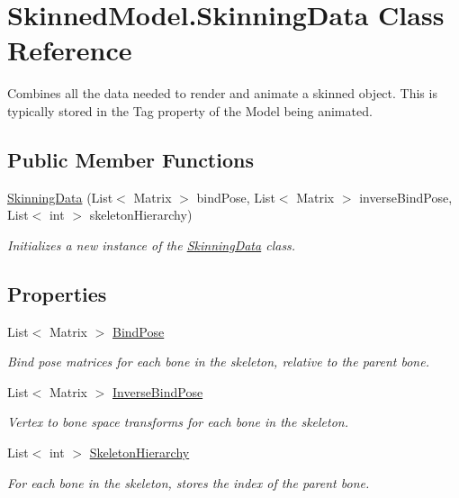\hypertarget{class_skinned_model_1_1_skinning_data}{\section{Skinned\+Model.\+Skinning\+Data Class Reference}
\label{class_skinned_model_1_1_skinning_data}
}


Combines all the data needed to render and animate a skinned object. This is typically stored in the Tag property of the Model being animated.  


\subsection*{Public Member Functions}
\begin{DoxyCompactItemize}
\item 
\hyperlink{class_skinned_model_1_1_skinning_data_afec5d3b876e4a1b553d6aa6b0c88aee5}{Skinning\+Data} (List$<$ Matrix $>$ bind\+Pose, List$<$ Matrix $>$ inverse\+Bind\+Pose, List$<$ int $>$ skeleton\+Hierarchy)
\begin{DoxyCompactList}\small\item\em Initializes a new instance of the \hyperlink{class_skinned_model_1_1_skinning_data}{Skinning\+Data} class. \end{DoxyCompactList}\end{DoxyCompactItemize}
\subsection*{Properties}
\begin{DoxyCompactItemize}
\item 
List$<$ Matrix $>$ \hyperlink{class_skinned_model_1_1_skinning_data_a9cc764c802f632777c48cf7d4cec6e3f}{Bind\+Pose}
\begin{DoxyCompactList}\small\item\em Bind pose matrices for each bone in the skeleton, relative to the parent bone. \end{DoxyCompactList}\item 
List$<$ Matrix $>$ \hyperlink{class_skinned_model_1_1_skinning_data_a480419d9a7614d8e72b95e694d9ce908}{Inverse\+Bind\+Pose}
\begin{DoxyCompactList}\small\item\em Vertex to bone space transforms for each bone in the skeleton. \end{DoxyCompactList}\item 
List$<$ int $>$ \hyperlink{class_skinned_model_1_1_skinning_data_a83e303f9faee1c4c121897106a450f30}{Skeleton\+Hierarchy}
\begin{DoxyCompactList}\small\item\em For each bone in the skeleton, stores the index of the parent bone. \end{DoxyCompactList}\end{DoxyCompactItemize}



